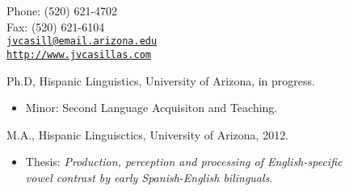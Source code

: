 \documentclass[11pt]{article}
\makeatletter
\def\myemail{jvcasill@email.arizona.edu}
\def\myweb{http://www.jvcasillas.com}
\def\myphone{(520) 621-4702}
\def\myfax{(520) 621-6104}
\makeatother
\begin{document}
\begin{minipage}[t]{3.3in}
  
\end{minipage}
\hfill     
\hfill
\begin{minipage}[t]{1.7in}
  \flushright \footnotesize Phone: \myphone \\ 
  Fax: \myfax  \\ 
  {\scriptsize \texttt{\href{mailto:\myemail}{\myemail}}} \\
  {\scriptsize \texttt{\href{\myweb}{\myweb}}}
\end{minipage}


\bigskip

\vspace{.1in}
\reversemarginpar

\bigskip       




\noindent Ph.D, Hispanic Linguistics, University of Arizona, in progress. \vspace{-0.1in}
\begin{itemize}
  \item \small Minor: Second Language Acquisiton and Teaching.
\end{itemize} 

\noindent M.A., Hispanic Linguisctics, University of Arizona, 2012. \vspace{-0.1in}
\begin{itemize}
  \item \small Thesis: \emph{Production, perception and processing of English-specific \\vowel contrast by early Spanish-English bilinguals}.
\end{itemize} 
\end{document}
